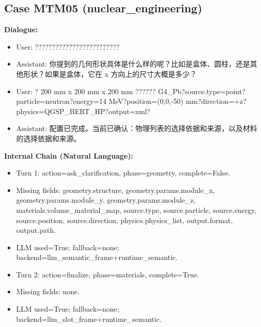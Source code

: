 \documentclass[11pt]{ctexart}
\begin{document}
\subsection{Case MTM05 (nuclear\_engineering)}
\textbf{Dialogue:}
\begin{itemize}
\item User: ?????????????????????????
\item Assistant: 你提到的几何形状具体是什么样的呢？比如是盒体、圆柱，还是其他形状？如果是盒体，它在 x 方向上的尺寸大概是多少？
\item User: ? 200 mm x 200 mm x 200 mm ?????? G4\_Pb?source.type=point?particle=neutron?energy=14 MeV?position=(0,0,-50) mm?direction=+z?physics=QGSP\_BERT\_HP?output=xml?
\item Assistant: 配置已完成。当前已确认：物理列表的选择依据和来源，以及材料的选择依据和来源。
\end{itemize}
\textbf{Internal Chain (Natural Language):}
\begin{itemize}
\item Turn 1: action=ask\_clarification, phase=geometry, complete=False.
\item Missing fields: geometry.structure, geometry.params.module\_x, geometry.params.module\_y, geometry.params.module\_z, materials.volume\_material\_map, source.type, source.particle, source.energy, source.position, source.direction, physics.physics\_list, output.format, output.path.
\item LLM used=True; fallback=none; backend=llm\_semantic\_frame+runtime\_semantic.
\item Turn 2: action=finalize, phase=materials, complete=True.
\item Missing fields: none.
\item LLM used=True; fallback=none; backend=llm\_slot\_frame+runtime\_semantic.
\end{itemize}
\end{document}
